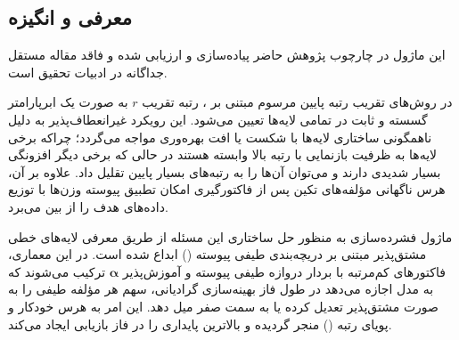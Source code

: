 \subsection{معرفی و انگیزه}
این ماژول در چارچوب پژوهش حاضر پیاده‌سازی و ارزیابی شده و فاقد مقاله مستقل جداگانه در ادبیات تحقیق است.

در روش‌های تقریب رتبه پایین مرسوم مبتنی بر ، رتبه تقریب $r$ به صورت یک ابرپارامتر گسسته و ثابت در تمامی لایه‌ها تعیین می‌شود. این رویکرد غیرانعطاف‌پذیر به دلیل ناهمگونی ساختاری لایه‌ها با شکست یا افت بهره‌وری مواجه می‌گردد؛ چراکه برخی لایه‌ها به ظرفیت بازنمایی با رتبه بالا وابسته هستند در حالی که برخی دیگر افزونگی بسیار شدیدی دارند و می‌توان آن‌ها را به رتبه‌های بسیار پایین تقلیل داد. علاوه بر آن، هرس ناگهانی مؤلفه‌های تکین پس از فاکتورگیری امکان تطبیق پیوسته وزن‌ها با توزیع داده‌های هدف را از بین می‌برد.

ماژول فشرده‌سازی  به منظور حل ساختاری این مسئله از طریق معرفی لایه‌های خطی مشتق‌پذیر مبتنی بر دریچه‌بندی طیفی پیوسته () ابداع شده است. در این معماری، فاکتورهای کم‌مرتبه با بردار دروازه طیفی پیوسته و آموزش‌پذیر $\boldsymbol{\alpha}$ ترکیب می‌شوند که به مدل اجازه می‌دهد در طول فاز بهینه‌سازی گرادیانی، سهم هر مؤلفه طیفی را به صورت مشتق‌پذیر تعدیل کرده یا به سمت صفر میل دهد. این امر به هرس خودکار و پویای رتبه () منجر گردیده و بالاترین پایداری را در فاز بازیابی ایجاد می‌کند.
